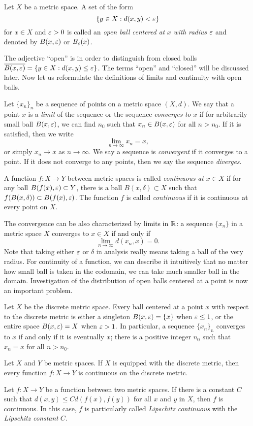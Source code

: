 \documentclass{../note}
\begin{document}
\begin{defn}
Let $X$ be a metric space.
A set of the form 
\[\{y\in X:d(x,y)<\varepsilon\}\]
for $x\in X$ and $\varepsilon>0$ is called an \emph{open ball centered at $x$ with radius $\varepsilon$} and denoted by $B(x,\varepsilon)$ or $B_\varepsilon(x)$.
\end{defn}

The adjective ``open'' is in order to distinguish from closed balls $\overline{B(x,\varepsilon)}=\{y\in X:d(x,y)\le\varepsilon\}$.
The terms ``open'' and ``closed'' will be discussed later.
Now let us reformulate the definitions of limits and continuity with open balls.

\begin{defn}
Let $\{x_n\}_n$ be a sequence of points on a metric space $(X,d)$.
We say that a point $x$ is a \emph{limit} of the sequence or the sequence \emph{converges to $x$} if for arbitrarily small ball $B(x,\varepsilon)$, we can find $n_0$ such that $x_n\in B(x,\varepsilon)$ for all $n>n_0$.
If it is satisfied, then we write
\[\lim_{n\to\infty}x_n=x,\]
or simply $x_n\to x$ as $n\to\infty$.
We say a sequence is \emph{convergent} if it converges to a point.
If it does not converge to any points, then we say the sequence \emph{diverges}.

A function $f:X\to Y$ between metric spaces is called \emph{continuous at $x\in X$} if for any ball $B(f(x),\varepsilon)\subset Y$, there is a ball $B(x,\delta)\subset X$ such that $f(B(x,\delta))\subset B(f(x),\varepsilon)$.
The function $f$ is called \emph{continuous} if it is continuous at every point on $X$.
\end{defn}

The convergence can be also characterized by limits in $\mathbb{R}$: a sequence $\{x_n\}$ in a metric space $X$ converges to $x\in X$ if and only if
\[\lim_{n\to\infty}d(x_n,x)=0.\]
Note that taking either $\varepsilon$ or $\delta$ in analysis really means taking a ball of the very radius.
For continuity of a function, we can describe it intuitively that no matter how small ball is taken in the codomain, we can take much smaller ball in the domain.
Investigation of the distribution of open balls centered at a point is now an important problem.

\begin{ex}
\leavevmode
\begin{parts}
\item
Let $X$ be the discrete metric space.
Every ball centered at a point $x$ with respect to the discrete metric is either a singleton $B(x,\varepsilon)=\{x\}$ when $\varepsilon\le1$, or the entire space $B(x,\varepsilon)=X$ when $\varepsilon>1$.
In particular, a sequence $\{x_n\}_n$ converges to $x$ if and only if it is eventually $x$; there is a positive integer $n_0$ such that $x_n=x$ for all $n>n_0$.
\item
Let $X$ and $Y$ be metric spaces.
If $X$ is equipped with the discrete metric, then every function $f:X\to Y$ is continuous on the discrete metric.
\item
Let $f:X\to Y$ be a function between two metric spaces.
If there is a constant $C$ such that $d(x,y)\le Cd(f(x),f(y))$ for all $x$ and $y$ in $X$, then $f$ is continuous.
In this case, $f$ is particularly called \emph{Lipschitz continuous} with the \emph{Lipschitz constant} $C$.
\end{parts}
\end{ex}
\end{document}
